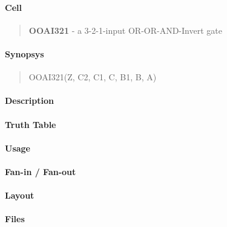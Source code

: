 \label{OOAI321}
\paragraph{Cell}
\begin{quote}
    \textbf{OOAI321} - a 3-2-1-input OR-OR-AND-Invert gate
\end{quote}

\paragraph{Synopsys}
\begin{quote}
    OOAI321(Z, C2, C1, C, B1, B, A)
\end{quote}

\paragraph{Description}



\paragraph{Truth Table}


\paragraph{Usage}

\paragraph{Fan-in / Fan-out}

\paragraph{Layout}

\paragraph{Files}
